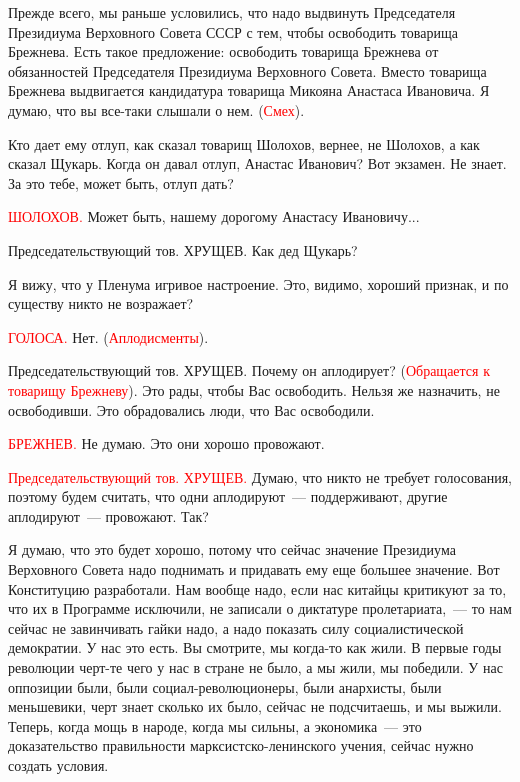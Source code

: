 \documentclass{kursa4}
\begin{document}
      {Прежде всего, мы раньше условились, что надо выдвинуть Председателя Президиума Верховного Совета СССР с тем, чтобы освободить товарища Брежнева. Есть такое предложение: освободить товарища Брежнева от обязанностей Председателя Президиума Верховного Совета. Вместо товарища Брежнева выдвигается кандидатура товарища Микояна Анастаса Ивановича. Я думаю, что вы все-таки слышали о нем. (}\textcolor{red}{Смех}{).}

      {Кто дает ему отлуп, как сказал товарищ Шолохов, вернее, не Шолохов, а как сказал Щукарь. Когда он давал отлуп, Анастас Иванович? Вот экзамен. Не знает. За это тебе, может быть, отлуп дать?}

      \textcolor{red}{ШОЛОХОВ.}{
      Может быть, нашему дорогому Анастасу Ивановичу...}

      {Председательствующий тов. ХРУЩЕВ. Как дед Щукарь?}

      {Я вижу, что у Пленума игривое настроение. Это, видимо, хороший признак, и по существу никто не возражает?}

      \textcolor{red}{ГОЛОСА.}{
      Нет. (}\textcolor{red}{Аплодисменты}{).}

      {Председательствующий тов. ХРУЩЕВ. Почему он аплодирует? (}\textcolor{red}{Обращается к товарищу Брежневу}{). Это рады, чтобы Вас освободить. Нельзя же назначить, не освободивши. Это обрадовались люди, что Вас освободили.}

      \textcolor{red}{БРЕЖНЕВ.}{
      Не думаю. Это они хорошо провожают.}

      \textcolor{red}{Председательствующий тов. ХРУЩЕВ.}{ Думаю, что никто не требует голосования, поэтому будем считать, что одни аплодируют~--- поддерживают, другие аплодируют~--- провожают. Так?}

      {Я думаю, что это будет хорошо, потому что сейчас значение Президиума Верховного Совета надо поднимать и придавать ему еще большее значение. Вот Конституцию разработали. Нам вообще надо, если нас китайцы критикуют за то, что их в Программе исключили, не записали о диктатуре пролетариата,~--- то нам сейчас не завинчивать гайки надо, а надо показать силу социалистической демократии. У нас это есть. Вы смотрите, мы когда-то как жили. В первые годы революции черт-те чего у нас в стране не было, а мы жили, мы победили. У нас оппозиции были, были социал-революционеры, были анархисты, были меньшевики, черт знает сколько их было, сейчас не подсчитаешь, и мы выжили. Теперь, когда мощь в народе, }{когда мы сильны, а экономика~--- это доказательство правильности марксистско-ленинского учения, сейчас нужно создать условия.}
\end{document}
